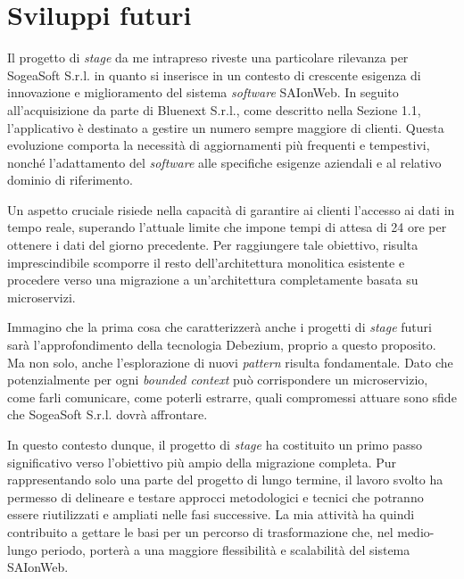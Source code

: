     \section{Sviluppi futuri}
    Il progetto di \textit{stage} da me intrapreso riveste una particolare rilevanza per SogeaSoft S.r.l. in quanto si inserisce in un contesto di crescente esigenza di innovazione e miglioramento del sistema \textit{software} SAIonWeb. In seguito all'acquisizione da parte di Bluenext S.r.l., come descritto nella Sezione 1.1, l'applicativo è destinato a gestire un numero sempre maggiore di clienti. Questa evoluzione comporta la necessità di aggiornamenti più frequenti e tempestivi, nonché l'adattamento del \textit{software} alle specifiche esigenze aziendali e al relativo dominio di riferimento.  

    \vspace{0.2 em}
    \noindent Un aspetto cruciale risiede nella capacità di garantire ai clienti l'accesso ai dati in tempo reale, superando l'attuale limite che impone tempi di attesa di 24 ore per ottenere i dati del giorno precedente. Per raggiungere tale obiettivo, risulta imprescindibile scomporre il resto dell'architettura monolitica esistente e procedere verso una migrazione a un'architettura completamente basata su microservizi.  

    \vspace{0.2 em}
    \noindent Immagino che la prima cosa che caratterizzerà anche i progetti di \textit{stage} futuri sarà l'approfondimento della tecnologia Debezium, proprio a questo proposito. Ma non solo, anche l'esplorazione di nuovi \textit{pattern} risulta fondamentale. Dato che potenzialmente per ogni \textit{bounded context} può corrispondere un microservizio, come farli comunicare, come poterli estrarre, quali compromessi attuare sono sfide che SogeaSoft S.r.l. dovrà affrontare. 

     \vspace{0.2 em}
     \noindent In questo contesto dunque, il progetto di \textit{stage} ha costituito un primo passo significativo verso l'obiettivo più ampio della migrazione completa. Pur rappresentando solo una parte del progetto di lungo termine, il lavoro svolto ha permesso di delineare e testare approcci metodologici e tecnici che potranno essere riutilizzati e ampliati nelle fasi successive. La mia attività ha quindi contribuito a gettare le basi per un percorso di trasformazione che, nel medio-lungo periodo, porterà a una maggiore flessibilità e scalabilità del sistema SAIonWeb.
    
    
    